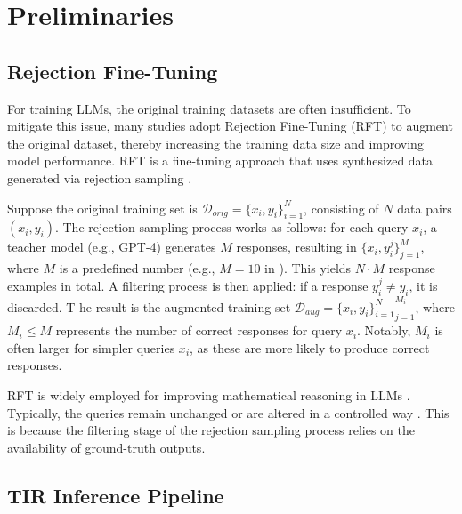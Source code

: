 \section{Preliminaries}\label{app:background}

\subsection{Rejection Fine-Tuning}\label{app:rft}
For training LLMs, the original training datasets are often insufficient. 
To mitigate this issue, many studies adopt Rejection Fine-Tuning (RFT) \citep{RFT2023Yuan, metamath2023yu, dartmath2024tong} to augment the original dataset, thereby increasing the training data size and improving model performance. RFT is a fine-tuning approach that uses synthesized data generated via rejection sampling \citep{RFT2023Yuan}.

Suppose the original training set is $\mathcal{D}_{orig} = \{x_i, y_i \}_{i=1}^N$, consisting of $N$ data pairs $(x_i, y_i)$. 
The rejection sampling process works as follows: for each query $x_i$, a teacher model (e.g., GPT-4) generates $M$ responses, resulting in $\{x_i, y_i^j \}_{j=1}^M$, where $M$ is a predefined number (e.g., $M=10$ in \citet{metamath2023yu}). 
This yields $N \cdot M$ response examples in total.
A filtering process is then applied: if a response $y_i^j \neq y_i$, it is discarded. T
he result is the augmented training set $\mathcal{D}_{aug} = {\{x_i, y_i \}_{i=1}^N}_{j=1}^{M_i}$, where $M_i \leq M$ represents the number of correct responses for query $x_i$.
Notably, $M_i$ is often larger for simpler queries $x_i$, as these are more likely to produce correct responses.

RFT is widely employed for improving mathematical reasoning in LLMs \citep{metamath2023yu, dartmath2024tong, E-GSM2024Xu}. 
Typically, the queries remain unchanged \citep{dartmath2024tong} or are altered in a controlled way \citep{metamath2023yu}. 
This is because the filtering stage of the rejection sampling process relies on the availability of ground-truth outputs.



\subsection{TIR Inference Pipeline}\label{app:tir}

